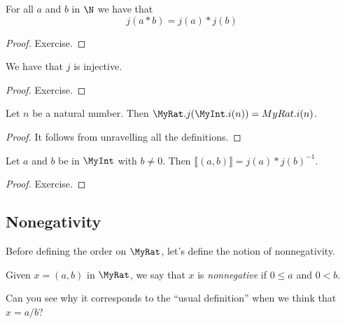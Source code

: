 \begin{lemma}
    \label{MyRat.j_mul}
    \leanok
For all $a$ and $b$ in $\N$ we have that
\[
j(a*b) = j(a) * j(b)
\]
\end{lemma}
\begin{proof}
    \leanok
Exercise.
\end{proof}

\begin{lemma}
    \label{MyRat.j_injective}
    \leanok
    We have that $j$ is injective.
\end{lemma}
\begin{proof}
    \leanok
Exercise.
\end{proof}

\begin{lemma}
    \label{MyRat.j_comp_eq_i}
    \leanok
    Let $n$ be a natural number. Then $\MyRat.j (\MyInt.i (n)) = MyRat.i (n)$.
\end{lemma}
\begin{proof}
    \leanok
It follows from unravelling all the definitions.
\end{proof}

\begin{lemma}
    \label{MyRat.Quotient.mk_def}
    \leanok
    Let $a$ and $b$ be in $\MyInt$ with $b \neq 0$. Then $⟦ (a, b) ⟧ = j(a)*j(b)^{-1}$.
\end{lemma}
\begin{proof}
    \leanok
Exercise.
\end{proof}

\subsection{Nonegativity}

Before defining the order on $\MyRat$, let's define the notion of nonnegativity.

\begin{definition}
    \label{MyRat.IsNonneg}
    \leanok
Given $x = (a,b)$ in $\MyRat$, we say that $x$ is \emph{nonnegative} if $0 \leq a$ and $0 < b$.

Can you see why it corresponds to the ``usual definition'' when we think that $x = a/b$?
\end{definition}

